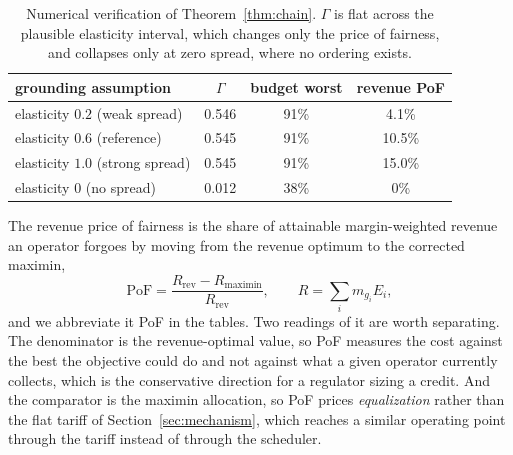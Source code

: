 \documentclass[manuscript, screen, review, anonymous]{acmart}
\begin{document}
\begin{table}[t]
\centering
\caption{Numerical verification of Theorem~\ref{thm:chain}. $\Gamma$ is flat across the plausible elasticity interval, which changes only the price of fairness, and collapses only at zero spread, where no ordering exists.}
\label{tab:grounding}
\begin{tabular}{lccc}
\toprule
grounding assumption & $\Gamma$ & budget worst & revenue PoF \\
\midrule
elasticity $0.2$ (weak spread)   & 0.546 & 91\% & 4.1\% \\
elasticity $0.6$ (reference)     & 0.545 & 91\% & 10.5\% \\
elasticity $1.0$ (strong spread) & 0.545 & 91\% & 15.0\% \\
elasticity $0$ (no spread)       & 0.012 & 38\% & 0\% \\
\bottomrule
\end{tabular}
\end{table}

The revenue price of fairness is the share of attainable margin-weighted revenue an operator forgoes by moving from the revenue optimum to the corrected maximin,
\begin{equation}
\mathrm{PoF}=\frac{R_{\mathrm{rev}}-R_{\mathrm{maximin}}}{R_{\mathrm{rev}}},\qquad R=\sum_i m_{g_i}E_i,
\label{eq:pof}
\end{equation}
and we abbreviate it PoF in the tables. Two readings of it are worth separating. The denominator is the revenue-optimal value, so PoF measures the cost against the best the objective could do and not against what a given operator currently collects, which is the conservative direction for a regulator sizing a credit. And the comparator is the maximin allocation, so PoF prices \emph{equalization} rather than the flat tariff of Section~\ref{sec:mechanism}, which reaches a similar operating point through the tariff instead of through the scheduler.
\end{document}
